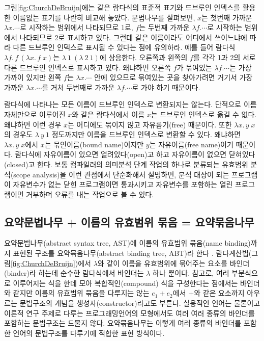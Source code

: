 그림\;\ref{fig:ChurchDeBruijn}에는 같은 람다식의 표준적 표기와
드브루인 인덱스를 활용한 이름없는 표기를 나란히 비교해 놓았다.
문법나무를 살펴보면,
$x$는 첫번째 가까운 $\lambda x.\cdots$로 시작하는 범위에서 나타되므로 1로,
$f$는 두번째 가까운 $\lambda f.\cdots$로 시작하는 범위에서 나타되므로 2로
표시하고 있다. 그런데 같은 이름이라도 어디에서 쓰이느냐에 따라 다른
드브루인 인덱스로 표시될 수 있다는 점에 유의하라. 예를 들어
람다식 $\lambda f.\,f\,(\lambda x.\,f\;x)$는 $\lambda~1~(\lambda~2~1)$에 상응한다.
오른쪽과 왼쪽의 $f$를 각각 1과 2의 서로 다른 드브루인 인덱스로 표시하고 있다.
왜냐하면 오른쪽 $f$가 묶여있는 $\lambda f.\cdots$는 가장 가까이 있지만
왼쪽 $f$는 $\lambda x.\cdots$ 안에 있으므로 묶여있는 곳을 찾아가려면
거기서 가장 가까운 $\lambda x.\cdots$를 거쳐 두번째로 가까운
$\lambda f.\cdots$로 가야 하기 때문이다.

람다식에 나타나는 모든 이름이 드브루인 인덱스로 변환되지는 않는다.
단적으로 이름 자체만으로 이루어진 $x$와 같은 람다식에서 이름 $x$는
드브루인 인덱스로 옮길 수 없다. 왜냐하면 이런 경우 $x$는 어디에도 묶이지
않고 자유롭기(free) 때문이다. 또한 $\lambda x.\,y\;x$의 경우도 
$\lambda~y~1$ 정도까지만 이름을 드브루인 인덱스로 변환할 수 있다.
왜냐하면 $\lambda x.\,y\;x$에서 $x$는 묶인이름(bound name)이지만
$y$는 자유이름(free name)이기 때문이다. 람다식에 자유이름이 있으면
열려있다(open)고 하고 자유이름이 없으면 닫혀있다(closed)고 한다.
보통 컴파일러의 의미분석 단계 작업의 하나로 분류되는
유효범위 분석(scope analysis)을 이런 관점에서 단순화해서 설명하면,
분석 대상이 되는 프로그램이 자유변수가 없는 닫힌 프로그램이면 통과시키고
자유변수를 포함하는 열린 프로그램이면 거부하며 오류를 내는 작업으로 볼 수 있다.

\subsection{요약문법나무 + 이름의 유효범위 묶음 = 요약묶음나무}
요약문법나무(abstract syntax tree, AST)에
이름의 유효범위 묶음(name binding)까지 표현된 구조를
요약묶음나무(abstract binding tree, ABT)라 한다 \cite{PFPL2nd}.
람다계산법(그림\;\ref{fig:ChurchDeBruijn})에서 $\lambda$와 같이
이름을 유효범위에 묶어주는 요소를 바인더(binder)라
하는데 순수한 람다식에서 바인더는 $\lambda$ 하나 뿐이다.
참고로, 여러 부분식으로 이루어지는 식을 한데 모아 복합적인(compound)
식을 구성한다는 점에서는 바인더와 같지만  이름의 유효범위 묶음을
다루지는 않는 $e_1 + e_2$에서 $+$와 같은 요소까지 아우르는 문법구조의
개념을 생성자(constructor)라고도 부른다.
실용적인 언어는 물론이고 이론적 연구 주제로 다루는 프로그래밍언어의
모형에서도 여러 여러 종류의 바인더를 포함하는 문법구조는 드물지 않다.
요약묶음나무는 이렇게 여러 종류의 바인더를 포함한 언어의 문법구조를
다루기에 적합한 표현 방식이다.

